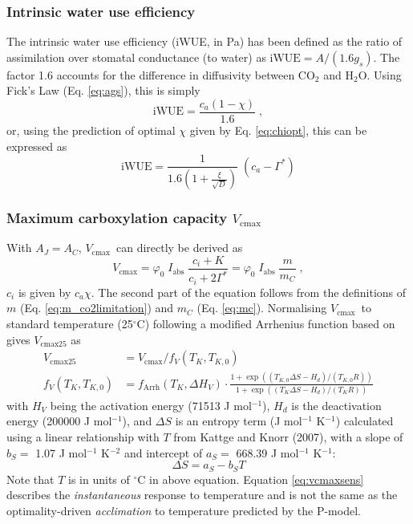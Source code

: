 \documentclass{myreport}
\newcommand{\vcmax}{$V_{\text{cmax}}$}
\begin{document}

\subsubsection{Intrinsic water use efficiency}
The intrinsic water use efficiency (iWUE, in Pa) has been defined as the ratio of assimilation over stomatal conductance (to water) \citep{beer09gbc} as $\text{iWUE} = A / (1.6 g_s)$. The factor 1.6 accounts for the difference in diffusivity between CO$_2$ and H$_2$O. Using Fick's Law (Eq. \ref{eq:ags}), this is simply
\begin{equation}
\label{eq:iwue}
    \mathrm{iWUE} = \frac{c_a (1-\chi)}{1.6} \;,
\end{equation}
or, using the prediction of optimal $\chi$ given by Eq. \ref{eq:chiopt}, this can be expressed as
\begin{equation}
    \text{iWUE} = \frac{1}{1.6 \left( 1+ \frac{\xi}{\sqrt{D}} \right) }\; (c_a - \Gamma^\ast)
\end{equation}

\subsubsection{Maximum carboxylation capacity
\label{sec:vcmax}
$V_{\mathrm{cmax}}$}
With $A_J=A_C$, \vcmax\ can directly be derived as 
\begin{equation}
    \label{eq:vcmax}
    V_{\mathrm{cmax}} = \varphi_0\;I_{\mathrm{abs}}\;\frac{c_i + K}{c_i + 2\Gamma^\ast} = \varphi_0\;I_{\mathrm{abs}}\; \frac{m}{m_C}\;,
\end{equation}
$c_i$ is given by $c_a \chi$. The second part of the equation follows from the definitions of $m$ (Eq. \ref{eq:m_co2limitation}) and $m_C$ (Eq. \ref{eq:mc}). Normalising \vcmax\ to standard temperature (25$^{\circ}$C) following a modified Arrhenius function based on \citet{kattge07} gives $V_{\mathrm{cmax25}}$ as
\begin{align}
    \label{eq:vcmax25}
    V_{\mathrm{cmax25}} &= V_{\mathrm{cmax}} / f_V (T_K, T_{K,0}) \\ 
    \label{eq:vcmaxsens}
    f_V (T_K, T_{K,0}) &= f_{\text{Arrh}}(T_K, \Delta H_V) \cdot \frac{1+\exp( (T_{K,0}\Delta S-H_d) / (T_{K,0} R) )}{1+\exp( (T_K\Delta S - H_d)/(T_K R) )}
\end{align}
with $H_V$ being the activation energy (71513 J mol$^{-1}$), $H_d$ is the deactivation energy (200000 J mol$^{-1}$), and $\Delta S$ is an entropy term (J mol$^{-1}$ K$^{-1}$) calculated using a linear relationship with $T$ from Kattge and Knorr (2007), with a slope of $b_S =$ 1.07 J mol$^{-1}$ K$^{-2}$ and intercept of $a_S = $ 668.39 J mol$^{-1}$ K$^{-1}$:
\begin{equation}
\label{eq:entropy}
    \Delta S = a_S - b_S T
\end{equation}
Note that $T$ is in units of $^{\circ}$C in above equation. Equation \ref{eq:vcmaxsens} describes the \textit{instantaneous} response to temperature and is not the same as the optimality-driven \textit{acclimation} to temperature predicted by the P-model.
\end{document}
